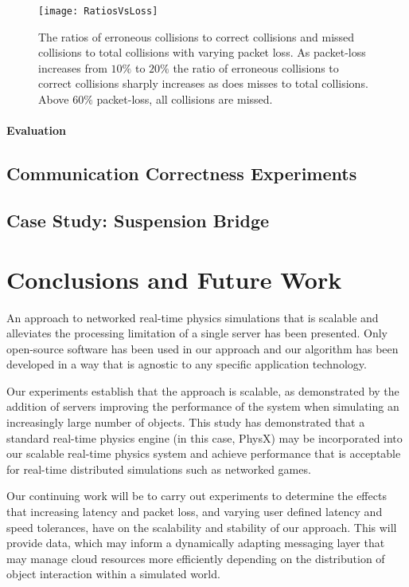 \begin{figure}[!t]
\centering
\texttt{[image: RatiosVsLoss]}
\caption{The ratios of erroneous collisions to correct collisions and missed collisions to total collisions with varying packet loss. As packet-loss increases from $10\%$ to $20\%$ the ratio of erroneous collisions to correct collisions sharply increases as does misses to total collisions. Above $60\%$ packet-loss, all collisions are missed.}
\label{fig_RatiosVsLoss}
\end{figure}

\subsubsection{Evaluation}

\section{Communication Correctness Experiments}

\section{Case Study: Suspension Bridge}

\chapter{Conclusions and Future Work}
An approach to networked real-time physics simulations that is scalable and alleviates the processing limitation of a single server has been presented. Only open-source software has been used in our approach and our algorithm has been developed in a way that is agnostic to any specific application technology.

Our experiments establish that the approach is scalable, as demonstrated by the addition of servers improving the performance of the system when simulating an increasingly large number of objects. This study has demonstrated that a standard real-time physics engine (in this case, PhysX) may be incorporated into our scalable real-time physics system and achieve performance that is acceptable for real-time distributed simulations such as networked games.

Our continuing work will be to carry out experiments to determine the effects that increasing latency and packet loss, and varying user defined latency and speed tolerances, have on the scalability and stability of our approach. This will provide data, which may inform a dynamically adapting messaging layer that may manage cloud resources more efficiently depending on the distribution of object interaction within a simulated world. 

